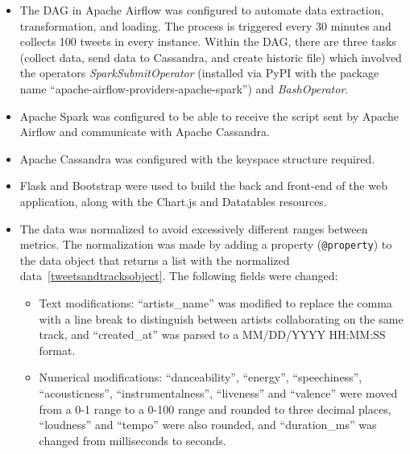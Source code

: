 \begin{itemize}
	\item The DAG in Apache Airflow was configured to automate data extraction, transformation, and loading. The process is triggered every 30 minutes and collects 100 tweets in every instance. Within the DAG, there are three tasks (collect data, send data to Cassandra, and create historic file) which involved the operators \textit{SparkSubmitOperator} (installed via PyPI with the package name ``apache-airflow-providers-apache-spark'') and \textit{BashOperator}.
	\item Apache Spark was configured to be able to receive the script sent by Apache Airflow and communicate with Apache Cassandra.
	\item Apache Cassandra was configured with the keyspace structure required.
	\item Flask and Bootstrap were used to build the back and front-end of the web application, along with the Chart.js and Datatables resources.
	\item The data was normalized to avoid excessively different ranges between metrics. The normalization was made by adding a property (\texttt{@property}) to the data object that returns a list with the normalized data~\ref{tweetsandtracksobject}. The following fields were changed:
	\begin{itemize}
		\item Text modifications: ``artists\_name'' was modified to replace the comma with a line break to distinguish between artists collaborating on the same track, and ``created\_at'' was parsed to a MM/DD/YYYY HH:MM:SS format.
		\item Numerical modifications: ``danceability'', ``energy'', ``speechiness'', ``acousticness'', ``instrumentalness'', ``liveness'' and ``valence'' were moved from a 0-1 range to a 0-100 range and rounded to three decimal places, ``loudness'' and ``tempo'' were also rounded, and ``duration\_ms'' was changed from milliseconds to seconds.
	\end{itemize}
\end{itemize}



